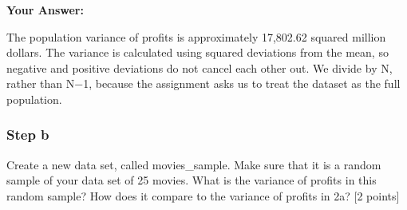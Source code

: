 \documentclass[
]{article}
\newenvironment{Shaded}{\begin{snugshade}}{\end{snugshade}}
\newcommand{\CommentTok}[1]{\textcolor[rgb]{0.56,0.35,0.01}{\textit{#1}}}
\newcommand{\DecValTok}[1]{\textcolor[rgb]{0.00,0.00,0.81}{#1}}
\newcommand{\DocumentationTok}[1]{\textcolor[rgb]{0.56,0.35,0.01}{\textbf{\textit{#1}}}}
\newcommand{\FunctionTok}[1]{\textcolor[rgb]{0.13,0.29,0.53}{\textbf{#1}}}
\newcommand{\NormalTok}[1]{#1}
\newcommand{\OtherTok}[1]{\textcolor[rgb]{0.56,0.35,0.01}{#1}}
\newcommand{\SpecialCharTok}[1]{\textcolor[rgb]{0.81,0.36,0.00}{\textbf{#1}}}
\begin{document}
\begin{Shaded}
\end{Shaded}

\textbf{Your Answer:}

The population variance of profits is approximately 17,802.62 squared
million dollars. The variance is calculated using squared deviations
from the mean, so negative and positive deviations do not cancel each
other out. We divide by N, rather than N−1, because the assignment asks
us to treat the dataset as the full population.

\subsubsection{Step b}\label{step-b-2}

Create a new data set, called movies\_sample. Make sure that it is a
random sample of your data set of 25 movies. What is the variance of
profits in this random sample? How does it compare to the variance of
profits in 2a? {[}2 points{]}

\begin{Shaded}
\end{Shaded}
\end{document}
